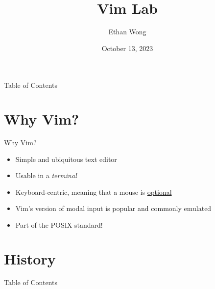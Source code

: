 \documentclass{beamer}
\title{Vim Lab}
\author{Ethan Wong}
\date{October 13, 2023}
\institute{Linux Users Group @ UIC}
\begin{document}
\begin{frame}
	\titlepage
\end{frame}

\begin{frame}{Table of Contents}
	\tableofcontents[pausesections]
\end{frame}

\section{Why Vim?}
\begin{frame}{Why Vim?}
	\begin{itemize}
		\item Simple and ubiquitous text editor 
		\item Usable in a \textit{terminal}
		\item Keyboard-centric, meaning that a mouse is
			\underline{optional}
		\item Vim's version of modal input is popular and commonly emulated
		\item Part of the POSIX standard!
	\end{itemize}
\end{frame}

\section{History}
\begin{frame}{Table of Contents}
	\tableofcontents[currentsection]
\end{frame}
\end{document}
